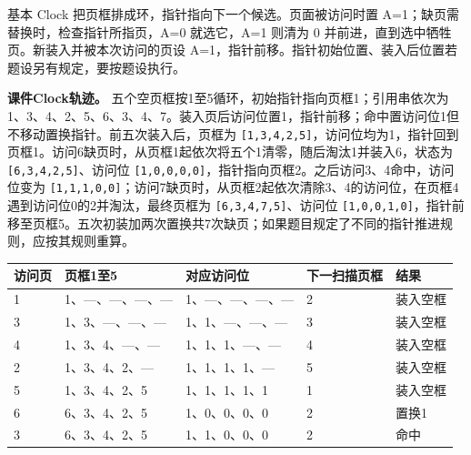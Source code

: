 基本 Clock 把页框排成环，指针指向下一个候选。页面被访问时置 A=1；缺页需替换时，检查指针所指页，A=0 就选它，A=1 则清为 0 并前进，直到选中牺牲页。新装入并被本次访问的页设 A=1，指针前移。指针初始位置、装入后位置若题设另有规定，要按题设执行。

\textbf{课件Clock轨迹。} 五个空页框按1至5循环，初始指针指向页框1；引用串依次为1、3、4、2、5、6、3、4、7。装入页后访问位置1，指针前移；命中置访问位1但不移动置换指针。前五次装入后，页框为 \texttt{[\allowbreak{}1,\allowbreak{}3,\allowbreak{}4,\allowbreak{}2,\allowbreak{}5]\allowbreak{}}，访问位均为1，指针回到页框1。访问6缺页时，从页框1起依次将五个1清零，随后淘汰1并装入6，状态为 \texttt{[\allowbreak{}6,\allowbreak{}3,\allowbreak{}4,\allowbreak{}2,\allowbreak{}5]\allowbreak{}}、访问位 \texttt{[\allowbreak{}1,\allowbreak{}0,\allowbreak{}0,\allowbreak{}0,\allowbreak{}0]\allowbreak{}}，指针指向页框2。之后访问3、4命中，访问位变为 \texttt{[\allowbreak{}1,\allowbreak{}1,\allowbreak{}1,\allowbreak{}0,\allowbreak{}0]\allowbreak{}}；访问7缺页时，从页框2起依次清除3、4的访问位，在页框4遇到访问位0的2并淘汰，最终页框为 \texttt{[\allowbreak{}6,\allowbreak{}3,\allowbreak{}4,\allowbreak{}7,\allowbreak{}5]\allowbreak{}}、访问位 \texttt{[\allowbreak{}1,\allowbreak{}0,\allowbreak{}0,\allowbreak{}1,\allowbreak{}0]\allowbreak{}}，指针前移至页框5。五次初装加两次置换共7次缺页；如果题目规定了不同的指针推进规则，应按其规则重算。

\begin{wideblock}\par\medskip\noindent\begin{minipage}{\linewidth}\fontsize{9.3}{12}\selectfont\begin{tabularx}{\linewidth}{@{}YYYYY@{}}
\toprule\noalign{}
访问页 & 页框1至5 & 对应访问位 & 下一扫描页框 & 结果 \\
\midrule\noalign{}


1 & 1、---、---、---、--- & 1、---、---、---、--- & 2 & 装入空框 \\
3 & 1、3、---、---、--- & 1、1、---、---、--- & 3 & 装入空框 \\
4 & 1、3、4、---、--- & 1、1、1、---、--- & 4 & 装入空框 \\
2 & 1、3、4、2、--- & 1、1、1、1、--- & 5 & 装入空框 \\
5 & 1、3、4、2、5 & 1、1、1、1、1 & 1 & 装入空框 \\
6 & 6、3、4、2、5 & 1、0、0、0、0 & 2 & 置换1 \\
3 & 6、3、4、2、5 & 1、1、0、0、0 & 2 & 命中 \\
\bottomrule\end{tabularx}
\end{minipage}\par\medskip\end{wideblock}

